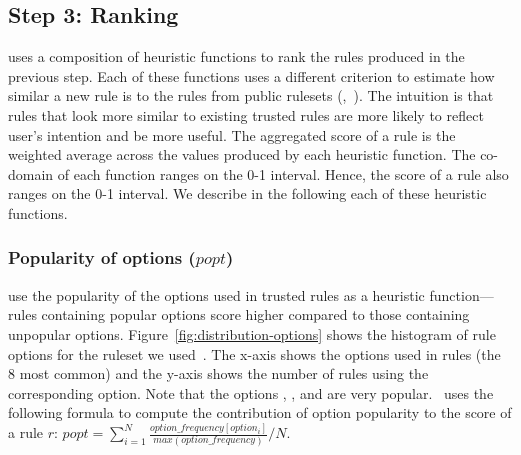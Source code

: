 \documentclass[conference]{IEEEtran}
\begin{document}


\subsection{Step 3: Ranking}
\label{sec:ranking}

\tname{} uses a composition of heuristic functions to rank the rules
produced in the previous step. Each of these functions uses a
different criterion to estimate how similar a new rule is to the rules
from public rulesets (\eg{},~\cite{emerging-threats-open}). The
intuition is that rules that look more similar to existing trusted
rules are more likely to reflect user's intention and be more
useful. The aggregated score of a rule is the weighted average across
the values produced by each heuristic function. The co-domain of each
function ranges on the 0-1 interval. Hence, the score of a rule also
ranges on the 0-1 interval. We describe in the following each of these
heuristic functions.



\subsubsection{\label{sec:popularity-options}Popularity of options ($popt$)}

\tname{} use the popularity of the options used in trusted rules as a
heuristic function---rules containing popular options score higher
compared to those containing unpopular
options. Figure~\ref{fig:distribution-options} shows the histogram of
rule options for the ruleset we used~\cite{emerging-threats-open}. The
x-axis shows the options used in rules (the 8 most common) and the
y-axis shows the number of rules using the corresponding option. Note
that the options , , and 
are very popular. \tname\ uses the following formula to compute the
contribution of option popularity to the score of a rule $r$:
\indent
$popt = \sum_{i=1}^{N}\frac{\mathit{option\_frequency[option_i]}}{\mathit{max(option\_frequency)}}/N$.
\end{document}
